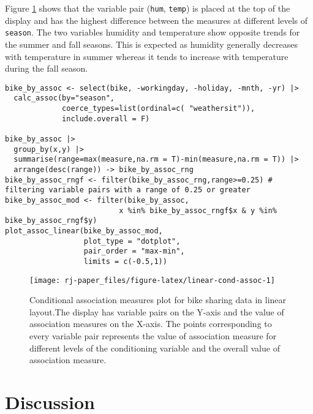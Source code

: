 Figure \ref{fig:linear-cond-assoc} shows that the variable pair (\texttt{hum}, \texttt{temp}) is placed at the top of the display and has the highest difference between the measures at different levels of \texttt{season}. The two variables humidity and temperature show opposite trends for the summer and fall seasons. This is expected as humidity generally decreases with temperature in summer whereas it tends to increase with temperature during the fall season.

\begin{verbatim}
bike_by_assoc <- select(bike, -workingday, -holiday, -mnth, -yr) |>
  calc_assoc(by="season", 
             coerce_types=list(ordinal=c( "weathersit")),
             include.overall = F)

bike_by_assoc |> 
  group_by(x,y) |> 
  summarise(range=max(measure,na.rm = T)-min(measure,na.rm = T)) |> 
  arrange(desc(range)) -> bike_by_assoc_rng
bike_by_assoc_rngf <- filter(bike_by_assoc_rng,range>=0.25) # filtering variable pairs with a range of 0.25 or greater
bike_by_assoc_mod <- filter(bike_by_assoc,
                          x %in% bike_by_assoc_rngf$x & y %in% bike_by_assoc_rngf$y)
plot_assoc_linear(bike_by_assoc_mod, 
                  plot_type = "dotplot",
                  pair_order = "max-min",
                  limits = c(-0.5,1))
\end{verbatim}

\begin{figure}

\texttt{[image: rj-paper\_files/figure-latex/linear-cond-assoc-1]} \hfill{}

\caption{Conditional association measures plot for bike sharing data in linear layout.The display has variable pairs on the Y-axis and the value of association measures on the X-axis. The points corresponding to every variable pair represents the value of association measure for different levels of the conditioning variable and the overall value of association measure.}\label{fig:linear-cond-assoc}
\end{figure}

\hypertarget{discussion}{%
\section{Discussion}\label{discussion}}


